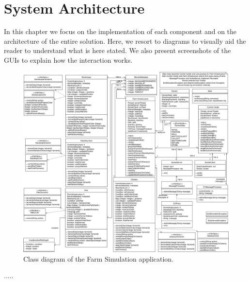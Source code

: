\documentclass[12pt]{article}
\begin{document}
\newpage
\section{System Architecture} %

In this chapter we focus on the implementation of each component and on the architecture of the entire solution.
Here, we resort to diagrams to visually aid the reader to understand what is here stated.
We also present screenshots of the GUIs to explain how the interaction works.

\begin{figure}[H]
  \centering
  \begin{minipage}{\textwidth}
    \centering
    \includegraphics[width=\linewidth]{FarmSimulation_ClassDiagram.png}
  \end{minipage}%
  \caption{Class diagram of the Farm Simulation application.}
  \label{class_diagram}
\end{figure}

.....


\end{document}
